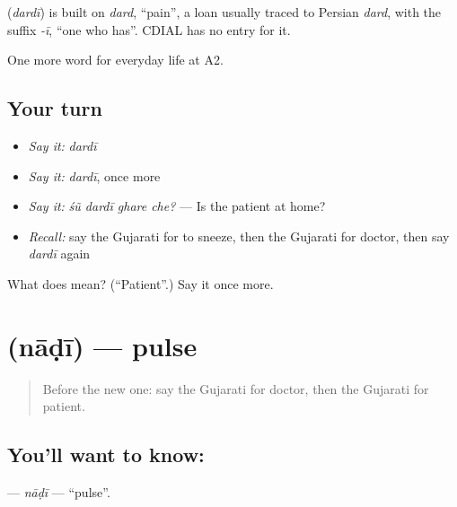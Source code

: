 \begin{cousinweb}
\textbf{} (\emph{dardī}) is built on \emph{dard}, \textquotedblleft{}pain\textquotedblright{}, a loan usually traced to Persian \emph{dard}, with the suffix \emph{-ī}, \textquotedblleft{}one who has\textquotedblright{}. CDIAL has no entry for it.
\end{cousinweb}

\begin{grammarlens}[title={What you've built}]
One more word for everyday life at A2.
\end{grammarlens}

\subsection*{Your turn}
\begin{itemize}
\raggedright
  \item \emph{Say it:} \emph{dardī}
  \item \emph{Say it:} \emph{dardī}, once more
  \item \emph{Say it:} \emph{śũ dardī ghare che?} — Is the patient at home?
  \item \emph{Recall:} say the Gujarati for to sneeze, then the Gujarati for doctor, then say \emph{dardī} again
\end{itemize}

\begin{tcolorbox}[breakable,colback=teal!4,colframe=teal!35!black,title={Before you move on}]
What does  mean? (\textquotedblleft{}Patient\textquotedblright{}.) Say it once more.
\end{tcolorbox}
\section[\texorpdfstring{\gu{નાડી} (nāḍī)}{નાડી (nāḍī)}]{ (nāḍī) — pulse}

\label{lesson:GU-C224-nadi}



\begin{quote}
Before the new one: say the Gujarati for doctor, then the Gujarati for patient.
\end{quote}

\subsection*{You'll want to know: }
\textbf{} — \emph{nāḍī} — \textquotedblleft{}pulse\textquotedblright{}.


